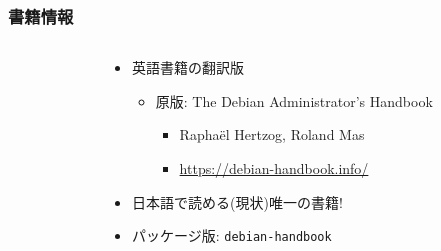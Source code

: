 \documentclass[cjk,c,squeeze,shrink,dvipdfmx,12pt,handout]{beamer}
\begin{document}
\begin{frame}
  \frametitle{書籍情報}
  \begin{columns}
    \begin{column}{.45\paperwidth}
      \centering
    \end{column}
    \begin{column}{.54\paperwidth}
      \begin{itemize}
      \item %
        英語書籍の翻訳版
        \begin{itemize}
        \item %
          原版: The Debian Administrator's Handbook
          \begin{itemize}
          \item %
            Rapha\"el Hertzog, Roland Mas
          \item \url{https://debian-handbook.info/}
          \end{itemize}
        \end{itemize}
      \item %
        日本語で読める(現状)唯一の書籍!
      \item %
        パッケージ版:
        \texttt{debian-handbook}
      \end{itemize}
    \end{column}
  \end{columns}
\end{frame}



\end{document}
